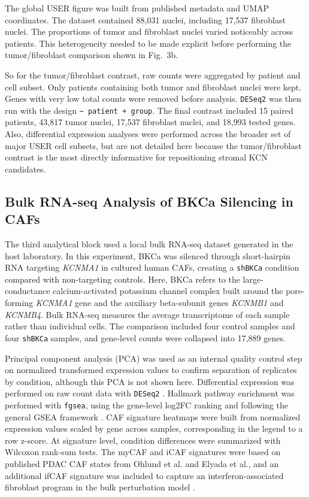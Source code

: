 \documentclass[11pt,a4paper]{article}
\begin{document}
The global USER figure was built from published metadata and UMAP coordinates. The dataset contained 88,031 nuclei, including 17,537 fibroblast nuclei. The proportions of tumor and fibroblast nuclei varied noticeably across patients. This heterogeneity needed to be made explicit before performing the tumor/fibroblast comparison shown in Fig.~3b.

So for the tumor/fibroblast contrast, raw counts were aggregated by patient and cell subset. Only patients containing both tumor and fibroblast nuclei were kept. Genes with very low total counts were removed before analysis. \texttt{DESeq2} was then run with the design \texttt{\textasciitilde{} patient + group}. The final contrast included 15 paired patients, 43,817 tumor nuclei, 17,537 fibroblast nuclei, and 18,993 tested genes.
Also, differential expression analyses were performed across the broader set of major USER cell subsets, but are not detailed here because the tumor/fibroblast contrast is the most directly informative for repositioning stromal KCN candidates.

\subsection{Bulk RNA-seq Analysis of BKCa Silencing in CAFs}
The third analytical block used a local bulk RNA-seq dataset generated in the host laboratory. In this experiment, BKCa was silenced through short-hairpin RNA targeting \textit{KCNMA1} in cultured human CAFs, creating a \texttt{shBKCa} condition compared with non-targeting controls. Here, BKCa refers to the large-conductance calcium-activated potassium channel complex built around the pore-forming \textit{KCNMA1} gene and the auxiliary beta-subunit genes \textit{KCNMB1} and \textit{KCNMB4}. Bulk RNA-seq measures the average transcriptome of each sample rather than individual cells. The comparison included four control samples and four \texttt{shBKCa} samples, and gene-level counts were collapsed into 17,889 genes.

Principal component analysis (PCA) was used as an internal quality control step on normalized transformed expression values to confirm separation of replicates by condition, although this PCA is not shown here. Differential expression was performed on raw count data with \texttt{DESeq2} \citep{love2014}. Hallmark pathway enrichment was performed with \texttt{fgsea}, using the gene-level log2FC ranking and following the general GSEA framework \citep{subramanian2005,korotkevich2021}. CAF signature heatmaps were built from normalized expression values scaled by gene across samples, corresponding in the legend to a row z-score. At signature level, condition differences were summarized with Wilcoxon rank-sum tests. The myCAF and iCAF signatures were based on published PDAC CAF states from Ohlund et al. and Elyada et al., and an additional ifCAF signature was included to capture an interferon-associated fibroblast program in the bulk perturbation model \citep{ohlund2017,elyada2019}.
\end{document}
